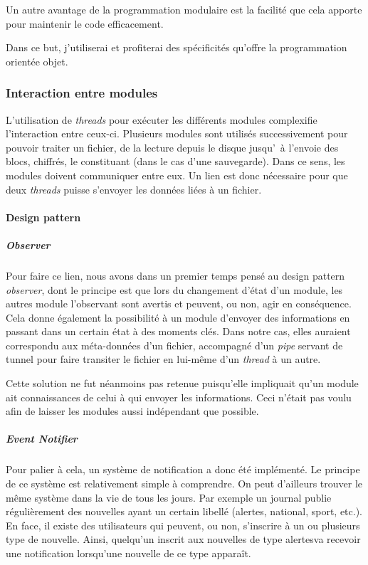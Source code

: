 \documentclass[a4paper,10pt, twoside]{report}
\begin{document}
\begin{spacing}{1.2}
Un autre avantage de la programmation modulaire est la facilit\'e que cela
apporte pour maintenir le code efficacement.

Dans ce but, j'utiliserai et profiterai des sp\'ecificit\'es qu'offre la
programmation orient\'ee objet.

\subsubsection{Interaction entre modules}

L'utilisation de \textit{threads} pour ex\'ecuter les diff\'erents modules
complexifie l'interaction entre ceux-ci. Plusieurs modules sont utilis\'es
successivement pour pouvoir traiter un fichier, de la lecture depuis le disque
jusqu'\ \`a l'envoie des blocs, chiffr\'es, le constituant (dans le cas d'une
sauvegarde). Dans ce sens, les modules doivent communiquer entre eux. Un lien
est donc n\'ecessaire pour que deux \textit{threads} puisse s'envoyer les
donn\'ees li\'ees \`a un fichier.

\paragraph{Design pattern}
\subparagraph{Observer\\}
Pour faire ce lien, nous avons dans un premier temps pens\'e au design pattern
\textit{observer}, dont le principe est que lors du changement d'\'etat d'un
module, les autres module l'observant sont avertis et peuvent, ou non, agir en
cons\'equence. Cela donne \'egalement la possibilit\'e \`a un module d'envoyer
des informations en passant dans un certain \'etat \`a des moments cl\'es. Dans
notre cas, elles auraient correspondu aux m\'eta-donn\'ees d'un fichier,
accompagn\'e d'un \textit{pipe} servant de tunnel pour faire transiter le
fichier en lui-m\^eme d'un \textit{thread} \`a un autre.

Cette solution ne fut n\'eanmoins pas retenue puisqu'elle impliquait qu'un
module ait connaissances de celui \`a qui envoyer les informations. Ceci
n'\'etait pas voulu afin de laisser les modules aussi ind\'ependant que
possible.

\subparagraph{Event Notifier\\}
Pour palier \`a cela, un syst\`eme de notification a donc \'et\'e
impl\'ement\'e. Le principe de ce syst\`eme est relativement simple \`a
comprendre. On peut d'ailleurs trouver le m\^eme syst\`eme dans la vie de
tous les jours. Par exemple un journal publie r\'eguli\`erement des nouvelles
ayant un certain libell\'e (\flqq alertes\frqq, \flqq national\frqq, \flqq
sport\frqq, etc.). En face, il existe des utilisateurs qui peuvent, ou non,
s'inscrire \`a un ou plusieurs type de nouvelle. Ainsi, quelqu'un inscrit aux
nouvelles de type \flqq alertes\frqq va recevoir une notification lorsqu'une
nouvelle de ce type appara\^it.


\end{spacing}
\end{document}
